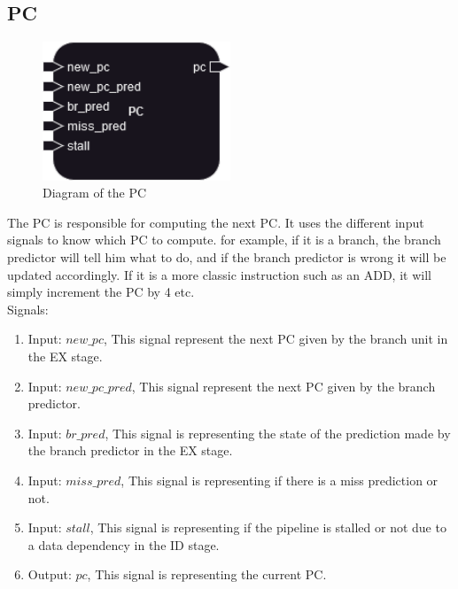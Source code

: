 \subsection{PC}

\begin{figure}[H]
\centering
\includegraphics[width=0.5\textwidth]{../diagrams/fetch/pc.png}
\caption{Diagram of the PC}
\label{fig:PC}
\end{figure}

The PC is responsible for computing the next PC. It uses the different input signals to know which PC to compute.
for example, if it is a branch, the branch predictor will tell him what to do, and if the branch predictor is wrong
it will be updated accordingly. If it is a more classic instruction such as an ADD, it will simply increment the PC by 4
etc. \\

Signals:
\begin{enumerate}
    \item Input: $new\_pc$, This signal represent the next PC given by the branch unit in the EX stage.
    \item Input: $new\_pc\_pred$, This signal represent the next PC given by the branch predictor.
    \item Input: $br\_pred$, This signal is representing the state of the prediction made by the branch predictor in the EX stage.
    \item Input: $miss\_pred$, This signal is representing if there is a miss prediction or not.
    \item Input: $stall$, This signal is representing if the pipeline is stalled or not due to a data dependency in the ID stage.
    \item Output: $pc$, This signal is representing the current PC.
\end{enumerate}